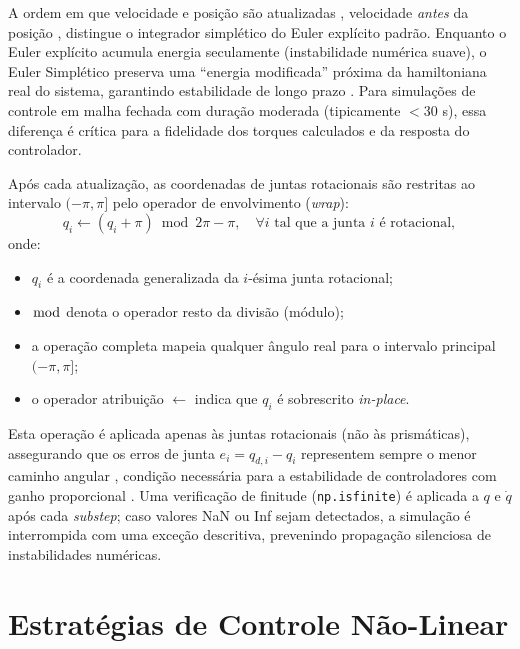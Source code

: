 A ordem em que velocidade e posição são atualizadas , velocidade \emph{antes} da posição , distingue o integrador simplético do Euler explícito padrão. Enquanto o Euler explícito acumula energia seculamente (instabilidade numérica suave), o Euler Simplético preserva uma ``energia modificada'' próxima da hamiltoniana real do sistema, garantindo estabilidade de longo prazo \cite{leimkuhler2004simulating, hairer2006geometric}. Para simulações de controle em malha fechada com duração moderada (tipicamente $< 30$ s), essa diferença é crítica para a fidelidade dos torques calculados e da resposta do controlador.

Após cada atualização, as coordenadas de juntas rotacionais são restritas ao intervalo $(-\pi, \pi]$ pelo operador de envolvimento (\textit{wrap}):
\begin{equation}
    q_i \leftarrow (q_i + \pi) \bmod 2\pi - \pi, \quad \forall i \text{ tal que a junta } i \text{ é rotacional},
    \label{eq:wrap}
\end{equation}
onde:
\begin{itemize}
    \item $q_i$ é a coordenada generalizada da $i$-ésima junta rotacional;
    \item $\bmod$ denota o operador resto da divisão (módulo);
    \item a operação completa mapeia qualquer ângulo real para o intervalo principal $(-\pi, \pi]$;
    \item o operador atribuição $\leftarrow$ indica que $q_i$ é sobrescrito \textit{in-place}.
\end{itemize}
Esta operação é aplicada apenas às juntas rotacionais (não às prismáticas), assegurando que os erros de junta $e_i = q_{d,i} - q_i$ representem sempre o menor caminho angular , condição necessária para a estabilidade de controladores com ganho proporcional \cite{spong2020robot}. Uma verificação de finitude (\texttt{np.isfinite}) é aplicada a $q$ e $\dot{q}$ após cada \textit{substep}; caso valores NaN ou Inf sejam detectados, a simulação é interrompida com uma exceção descritiva, prevenindo propagação silenciosa de instabilidades numéricas.

\section{Estratégias de Controle Não-Linear}
\label{sec:controle_impl}

